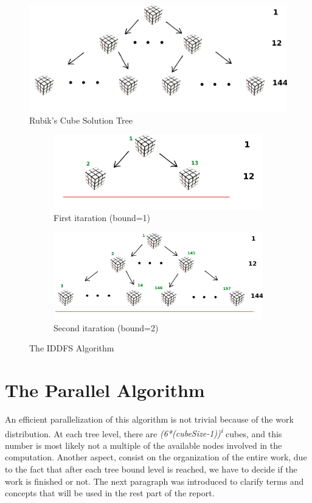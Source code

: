 \documentclass[a4paper]{article}
\begin{document}
\begin{figure}[ht]
  \centering
  \includegraphics[width=0.8\linewidth]{rubik_tree}
  \caption{Rubik's Cube Solution Tree}
  \label{fig:tree}
\end{figure}
\FloatBarrier


\begin{figure}
\begin{subfigure}{0.40\textwidth}
\includegraphics[width=\linewidth]{rubik_tree_eval1}
\caption{First itaration (bound=1)} \label{fig:ita}
\end{subfigure}
\hspace*{\fill} %
\begin{subfigure}{0.60\textwidth}
\includegraphics[width=\linewidth]{rubik_tree_eval2}
\caption{Second itaration (bound=2)} \label{fig:itb}
\end{subfigure}
\caption{The IDDFS Algorithm} \label{fig:iterations}
\end{figure}
\FloatBarrier

\section{The Parallel Algorithm}
\label{sec:par_algo}
An efficient parallelization of this algorithm is not trivial because of the work distribution. At each tree level, there are \textit{(6*(cubeSize-1))\textsuperscript{i}} cubes, and this number is most likely not a multiple of the available nodes involved in the computation. Another aspect, consist on the organization of the entire work, due to the fact that after each tree bound level is reached, we have to decide if the work is finished or not.  The next paragraph was introduced to clarify terms and concepts that will be used in the rest part of the report.
\end{document}
